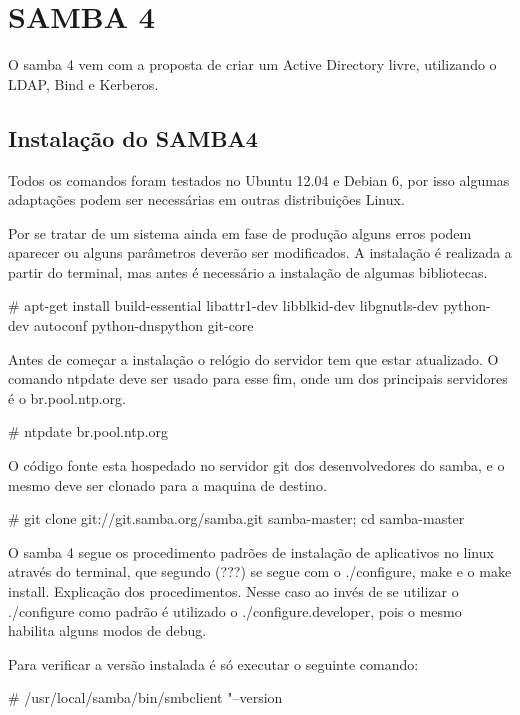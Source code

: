 \chapter{SAMBA 4}

O samba 4 vem com a proposta de criar um Active Directory livre, utilizando o LDAP, Bind e Kerberos.

\section{Instalação do SAMBA4}

Todos os comandos foram testados no Ubuntu 12.04 e Debian 6, por isso algumas adaptações podem ser necessárias em outras distribuições Linux.

Por se tratar de um sistema ainda em fase de produção alguns erros podem aparecer ou alguns parâmetros deverão ser modificados.
A instalação é realizada a partir do terminal, mas antes é necessário a instalação de algumas bibliotecas.

\# apt-get install build-essential libattr1-dev libblkid-dev libgnutls-dev python-dev autoconf python-dnspython git-core

Antes de começar a instalação o relógio do servidor tem que estar atualizado. O comando ntpdate deve ser usado para esse fim, onde um dos principais servidores é o br.pool.ntp.org.

\# ntpdate br.pool.ntp.org



O código fonte esta hospedado no servidor git dos desenvolvedores do samba, e o mesmo deve ser clonado para a maquina de destino.

\# git clone git://git.samba.org/samba.git samba-master; cd samba-master

O samba 4 segue os procedimento padrões de instalação de aplicativos no linux através do terminal, que segundo (???) se segue com o ./configure, make e o make install.
Explicação dos procedimentos.
Nesse caso ao invés de se utilizar o ./configure como padrão é utilizado o ./configure.developer, pois o mesmo habilita alguns modos de debug.

Para verificar a versão instalada é só executar o seguinte comando:

\# /usr/local/samba/bin/smbclient "--version 

